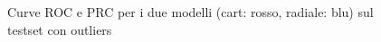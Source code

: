 \newpage

\begin{figure}[H]
    \centering

    
    \quad
    

    \label{fig:roc_prc_svm_outliers}
    \caption{Curve ROC e PRC per i due modelli (cart: rosso, radiale: blu) sul testset con outliers}
\end{figure}

